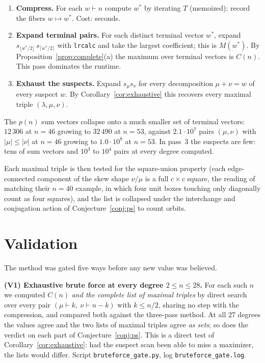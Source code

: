 \documentclass[11pt]{article}
\theoremstyle{remark}
\newcommand{\lam}{\lambda}
\begin{document}
\begin{enumerate}
\item \textbf{Compress.} For each $w\vdash n$ compute $w^\ast$ by iterating $T$
(memoized); record the fibers $w\mapsto w^\ast$. Cost: seconds.
\item \textbf{Expand terminal pairs.} For each distinct terminal vector $w^\ast$, expand
$s_{\lfloor w^\ast/2\rfloor}\, s_{\lceil w^\ast/2\rceil}$ with \texttt{lrcalc}
\cite{lrcalc} and take the largest coefficient; this is $M(w^\ast)$. By
Proposition~\ref{prop:complete}(a) the maximum over terminal vectors is $C(n)$. This pass
dominates the runtime.
\item \textbf{Exhaust the suspects.} Expand $s_\mu s_\nu$ for every decomposition
$\mu+\nu=w$ of every suspect $w$. By Corollary~\ref{cor:exhaustive} this recovers every
maximal triple $(\lam,\mu,\nu)$.
\end{enumerate}
The $p(n)$ sum vectors collapse onto a much smaller set of terminal vectors: $12\,306$ at
$n=46$ growing to $32\,490$ at $n=53$, against $2.1\cdot 10^{7}$ pairs $(\mu,\nu)$ with
$|\mu|\le|\nu|$ at $n=46$ growing to $1.0\cdot 10^{8}$ at $n=53$. In pass~3 the suspects
are few: tens of sum vectors and $10^3$ to $10^4$ pairs at every degree computed.

Each maximal triple is then tested for the square-union property (each edge-connected
component of the skew shape $\nu/\mu$ is a full $c\times c$ square, the reading of
\cite{PS26} matching their $n=40$ example, in which four unit boxes touching only
diagonally count as four squares), and the list is collapsed under the interchange and
conjugation action of Conjecture~\ref{conj:ps} to count orbits.

\section{Validation}\label{sec:validation}

The method was gated five ways before any new value was believed.

\medskip
\noindent\textbf{(V1) Exhaustive brute force at every degree $2\le n\le 28$.}
For each such $n$ we computed $C(n)$ \emph{and the complete list of maximal triples} by
direct search over every pair $(\mu\vdash k,\ \nu\vdash n-k)$ with $k\le n/2$, sharing no
step with the compression, and compared both against the three-pass method. At all $27$
degrees the values agree and the two lists of maximal triples agree \emph{as sets};
so does the verdict on each part of Conjecture~\ref{conj:ps}. This is a direct test of
Corollary~\ref{cor:exhaustive}: had the suspect scan been able to miss a maximizer, the
lists would differ. Script \texttt{bruteforce\_gate.py}, log
\texttt{bruteforce\_gate.log}.
\end{document}
